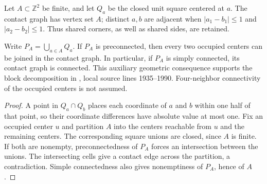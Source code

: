 \begin{definition}%
    \label{def:peps_integer_cell_contact_graph}
    \leanok
    Let $A\subset\mathbb Z^2$ be finite, and let $Q_a$ be the closed
    unit square centered at $a$. The contact graph has vertex set $A$;
    distinct $a,b$ are adjacent when $|a_1-b_1|\leq1$ and
    $|a_2-b_2|\leq1$. Thus shared corners, as well as shared sides,
    are retained.
\end{definition}

\begin{lemma}%
    \label{thm:peps_integer_cell_contact_connectivity}
    \leanok
    Write $P_A=\bigcup_{a\in A}Q_a$. If $P_A$ is preconnected, then
    every two occupied centers can be joined in the contact graph.
    In particular, if $P_A$ is simply connected, its contact graph
    is connected. This auxiliary geometric consequence supports the
    block decomposition in \cite[Theorem~6.9]{Schuch2010PEPS}, local
    source lines 1935--1990. Four-neighbor connectivity of the
    occupied centers is not assumed.
\end{lemma}

\begin{proof}\leanok
    A point in $Q_a\cap Q_b$ places each coordinate of $a$ and $b$
    within one half of that point, so their coordinate differences
    have absolute value at most one. Fix an occupied center $u$ and
    partition $A$ into the centers reachable from $u$ and the
    remaining centers. The corresponding square unions are closed,
    since $A$ is finite. If both are nonempty, preconnectedness of
    $P_A$ forces an intersection between the unions. The intersecting
    cells give a contact edge across the partition, a contradiction.
    Simple connectedness also gives nonemptiness of $P_A$, hence of $A$.
\end{proof}
